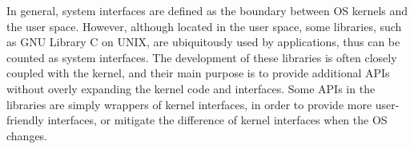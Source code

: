 In general, system interfaces are defined as the boundary between OS kernels and the user space.
However, although located in the user space, some libraries, such as GNU Library C on UNIX, are ubiquitously used by applications, thus can be counted as system interfaces.
The development of these libraries is often closely coupled with the kernel, and their main purpose is to provide additional APIs without overly expanding the kernel code and interfaces.
Some APIs in the libraries are simply wrappers of kernel interfaces,
in order to provide more user-friendly interfaces, or mitigate the difference of kernel interfaces when the OS changes.



